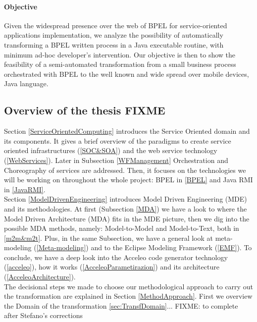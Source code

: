 \paragraph{Objective}
Given the widespread presence over the web of BPEL for service-oriented applications implementation, we analyze the possibility of automatically transforming a BPEL written process in a Java executable routine, with minimum ad-hoc developer's intervention.
Our objective is then to show the feasibility of a semi-automated transformation from a small business process orchestrated with BPEL to the well known and wide spread over mobile devices, Java language. 




\subsection{Overview of the thesis FIXME}
Section \ref{ServiceOrientedComputing} introduces the Service Oriented domain and its components. It gives a brief overview of the paradigms to create service oriented infrastructures (\ref{SOC&SOA}) and the web service technology (\ref{WebServices}). Later in Subsection \ref{WFManagement} Orchestration and Choreography of services are addressed. Then, it focuses on the technologies we will be working on throughout the whole project: BPEL in \ref{BPEL} and Java RMI in \ref{JavaRMI}. \\
Section \ref{ModelDrivenEngineering} introduces Model Driven Engineering (MDE) and its methodologies. At first (Subsection \ref{MDA}) we have a look to where the Model Driven Architecture (MDA) fits in the MDE picture, then we dig into the possible MDA methods, namely: Model-to-Model and Model-to-Text, both in \ref{m2m&m2t}. Plus, in the same Subsection, we have a general look at meta-modeling (\ref{Meta-modeling}) and to the Eclipse Modeling Framework (\ref{EMF}). To conclude, we have a deep look into the Acceleo code generator technology (\ref{acceleo}), how it works (\ref{AcceleoParametirazion}) and its architecture (\ref{AcceleoArchitecture}). \\
The decisional steps we made to choose our methodological approach to carry out the transformation are explained in Section \ref{MethodApproach}. First we overview the Domain of the transformation \ref{sec:TransfDomain}...
FIXME: to complete after Stefano's corrections

